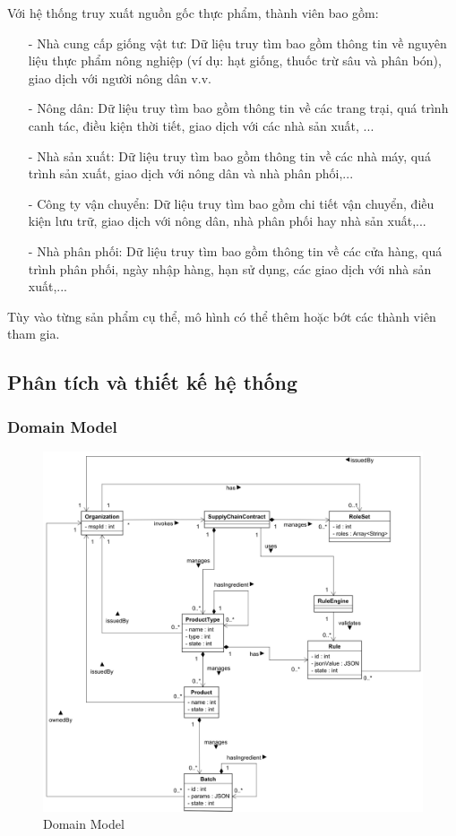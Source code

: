 Với hệ thống truy xuất nguồn gốc thực phẩm, thành viên bao gồm: 
\begin{itemize}
    \item[-] Nhà cung cấp giống vật tư: Dữ liệu truy tìm bao gồm thông tin về nguyên liệu 
    thực phẩm nông nghiệp (ví dụ: hạt giống, thuốc trừ sâu và phân bón), giao dịch với người nông dân v.v.
    \item[-] Nông dân: Dữ liệu truy tìm bao gồm thông tin về các trang trại, quá trình canh tác,
    điều kiện thời tiết, giao dịch với các nhà sản xuất, ...
    \item[-] Nhà sản xuất: Dữ liệu truy tìm bao gồm thông tin về các nhà máy, quá trình sản xuất,
    giao dịch với nông dân và nhà phân phối,...
    \item[-] Công ty vận chuyển: Dữ liệu truy tìm bao gồm chi tiết vận chuyển, điều kiện lưu trữ, giao
    dịch với nông dân, nhà phân phối hay nhà sản xuất,...
    \item[-] Nhà phân phối: Dữ liệu truy tìm bao gồm thông tin về các cửa hàng, quá trình phân phối,
    ngày nhập hàng, hạn sử dụng, các giao dịch với nhà sản xuất,...
\end{itemize}

Tùy vào từng sản phẩm cụ thể, mô hình có thể thêm hoặc bớt các thành viên tham gia. 
\subsection{Phân tích và thiết kế hệ thống}
\subsubsection{Domain Model}

\begin{figure}[h]
    \centering
    \includegraphics[width=1\textwidth]{images/domain_model.png}
    \caption{Domain Model } 
\end{figure}

